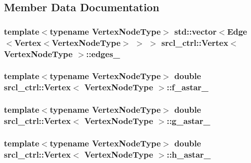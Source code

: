 \subsection{Member Data Documentation}
\hypertarget{classsrcl__ctrl_1_1Vertex_a70fcde693fe27f0d683edbe61bacf157}{
\subsubsection[{edges\-\_\-}]{\setlength{\rightskip}{0pt plus 5cm}template$<$typename Vertex\-Node\-Type$>$ std\-::vector$<${\bf Edge}$<${\bf Vertex}$<$Vertex\-Node\-Type$>$ $>$ $>$ {\bf srcl\-\_\-ctrl\-::\-Vertex}$<$ Vertex\-Node\-Type $>$\-::edges\-\_\-}}\label{classsrcl__ctrl_1_1Vertex_a70fcde693fe27f0d683edbe61bacf157}
\hypertarget{classsrcl__ctrl_1_1Vertex_a2e160af974d32d2d45c6919834e6c95e}{
\subsubsection[{f\-\_\-astar\-\_\-}]{\setlength{\rightskip}{0pt plus 5cm}template$<$typename Vertex\-Node\-Type$>$ double {\bf srcl\-\_\-ctrl\-::\-Vertex}$<$ Vertex\-Node\-Type $>$\-::f\-\_\-astar\-\_\-}}\label{classsrcl__ctrl_1_1Vertex_a2e160af974d32d2d45c6919834e6c95e}
\hypertarget{classsrcl__ctrl_1_1Vertex_a3e4031db49e20d962eb01daf9993a491}{
\subsubsection[{g\-\_\-astar\-\_\-}]{\setlength{\rightskip}{0pt plus 5cm}template$<$typename Vertex\-Node\-Type$>$ double {\bf srcl\-\_\-ctrl\-::\-Vertex}$<$ Vertex\-Node\-Type $>$\-::g\-\_\-astar\-\_\-}}\label{classsrcl__ctrl_1_1Vertex_a3e4031db49e20d962eb01daf9993a491}
\hypertarget{classsrcl__ctrl_1_1Vertex_a04fbe2b5fc6293e6f4298d1827847f91}{
\subsubsection[{h\-\_\-astar\-\_\-}]{\setlength{\rightskip}{0pt plus 5cm}template$<$typename Vertex\-Node\-Type$>$ double {\bf srcl\-\_\-ctrl\-::\-Vertex}$<$ Vertex\-Node\-Type $>$\-::h\-\_\-astar\-\_\-}}\label{classsrcl__ctrl_1_1Vertex_a04fbe2b5fc6293e6f4298d1827847f91}
